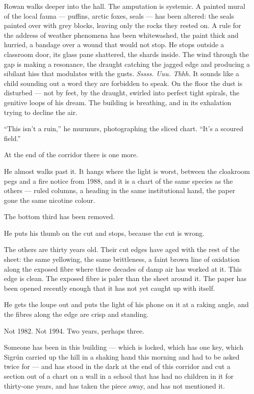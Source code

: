 \documentclass[11pt,oneside]{book}
\begin{document}
Rowan walks deeper into the hall. The amputation is systemic. A painted
mural of the local fauna --- puffins, arctic foxes, seals --- has been
altered: the seals painted over with grey blocks, leaving only the rocks
they rested on. A rule for the address of weather phenomena has been
whitewashed, the paint thick and hurried, a bandage over a wound that
would not stop. He stops outside a classroom door, its glass pane
shattered, the shards inside. The wind through the gap is making a
resonance, the draught catching the jagged edge and producing a sibilant
hiss that modulates with the gusts. \emph{Sssss. Uuu. Thhh.} It sounds
like a child sounding out a word they are forbidden to speak. On the
floor the dust is disturbed --- not by feet, by the draught, swirled
into perfect tight spirals, the genitive loops of his dream. The
building is breathing, and in its exhalation trying to decline the air.

``This isn't a ruin,'' he murmurs, photographing the sliced chart.
``It's a scoured field.''

At the end of the corridor there is one more.

He almost walks past it. It hangs where the light is worst, between the
cloakroom pegs and a fire notice from 1988, and it is a chart of the
same species as the others --- ruled columns, a heading in the same
institutional hand, the paper gone the same nicotine colour.

The bottom third has been removed.

He puts his thumb on the cut and stops, because the cut is wrong.

The others are thirty years old. Their cut edges have aged with the
rest of the sheet: the same yellowing, the same brittleness, a faint
brown line of oxidation along the exposed fibre where three decades of
damp air has worked at it. This edge is clean. The exposed fibre is
paler than the sheet around it. The paper has been opened recently
enough that it has not yet caught up with itself.

He gets the loupe out and puts the light of his phone on it at a raking
angle, and the fibres along the edge are crisp and standing.

Not 1982. Not 1994. Two years, perhaps three.

Someone has been in this building --- which is locked, which has one key,
which Sigrún carried up the hill in a shaking hand this morning and had
to be asked twice for --- and has stood in the dark at the end of this
corridor and cut a section out of a chart on a wall in a school that has
had no children in it for thirty-one years, and has taken the piece
away, and has not mentioned it.
\end{document}
